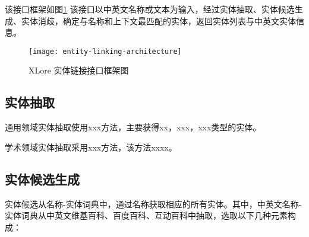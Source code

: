 该接口框架如图\ref{fig:entity-linking-architecture}
该接口以中英文名称或文本为输入，经过实体抽取、实体候选生成、实体消歧，确定与名称和上下文最匹配的实体，返回实体列表与中英文实体信息。
\begin{figure}[H] 
  \centering
  \texttt{[image: entity-linking-architecture]}
  \caption{XLore 实体链接接口框架图}
  \label{fig:entity-linking-architecture}
\end{figure}

\subsection{实体抽取}
通用领域实体抽取使用xxx方法，主要获得xx，xxx，xxx类型的实体。

学术领域实体抽取采用xxx方法，该方法xxxx。

\subsection{实体候选生成}

实体候选从名称-实体词典中，通过名称获取相应的所有实体。其中，中英文名称-实体词典从中英文维基百科、百度百科、互动百科中抽取，选取以下几种元素构成：

